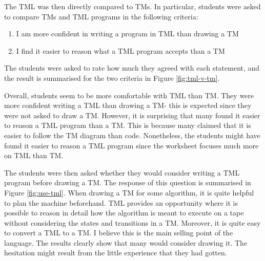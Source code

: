 The TML was then directly compared to TMs. In particular, students were asked to compare TMs and TML programs in the following criteria:
\begin{enumerate}
    \item I am more confident in writing a program in TML than drawing a TM
    \item I find it easier to reason what a TML program accepts than a TM
\end{enumerate}
The students were asked to rate how much they agreed with each statement, and the result is summarised for the two criteria in Figure \ref{fig:tml-v-tm}. 

Overall, students seem to be more comfortable with TML than TM. They were more confident writing a TML than drawing a TM- this is expected since they were not asked to draw a TM. However, it is surprising that many found it easier to reason a TML program than a TM. This is because many claimed that it is easier to follow the TM diagram than code. Nonetheless, the students might have found it easier to reason a TML program since the worksheet focuses much more on TML than TM.


The students were then asked whether they would consider writing a TML program before drawing a TM. The response of this question is summarised in Figure \ref{fig:use-tml}. When drawing a TM for some algorithm, it is quite helpful to plan the machine beforehand. TML provides an opportunity where it is possible to reason in detail how the algorithm is meant to execute on a tape without considering the states and transitions in a TM. Moreover, it is quite easy to convert a TML to a TM. I believe this is the main selling point of the language. The results clearly show that many would consider drawing it. The hesitation might result from the little experience that they had gotten.

